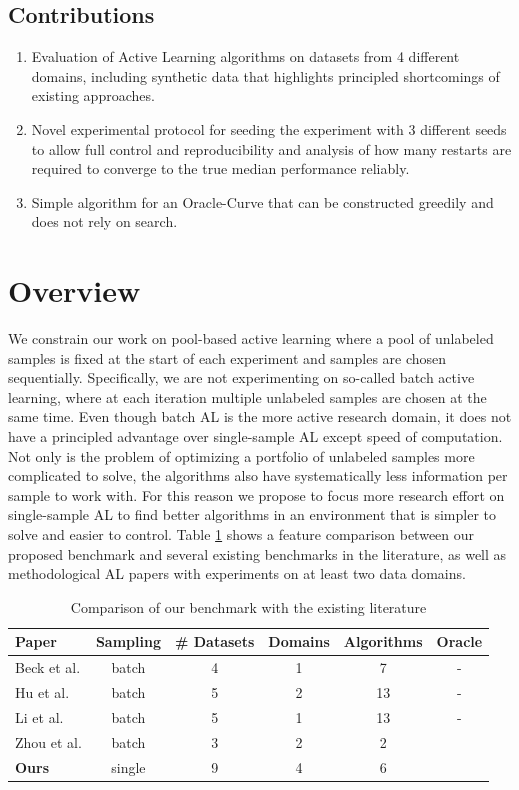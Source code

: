 \documentclass[]{article}
\begin{document}
\subsection{Contributions}
\begin{enumerate}
	\item Evaluation of Active Learning algorithms on datasets from 4 different domains, including synthetic data that highlights principled shortcomings of existing approaches.
	\item Novel experimental protocol for seeding the experiment with 3 different seeds to allow full control and reproducibility and analysis of how many restarts are required to converge to the true median performance reliably.
	\item Simple algorithm for an Oracle-Curve that can be constructed greedily and does not rely on search.
\end{enumerate}



\section{Overview}
We constrain our work on pool-based active learning where a pool of unlabeled samples is fixed at the start of each experiment and samples are chosen sequentially.
Specifically, we are not experimenting on so-called batch active learning, where at each iteration multiple unlabeled samples are chosen at the same time.
Even though batch AL is the more active research domain, it does not have a principled advantage over single-sample AL except speed of computation.
Not only is the problem of optimizing a portfolio of unlabeled samples more complicated to solve, the algorithms also have systematically less information per sample to work with.
For this reason we propose to focus more research effort on single-sample AL to find better algorithms in an environment that is simpler to solve and easier to control.
Table \ref{tab:benchmark_comparison} shows a feature comparison between our proposed benchmark and several existing benchmarks in the literature, as well as methodological AL papers with experiments on at least two data domains.
\begin{table}[h]
	\centering
	\begin{tabular}{l | c c c c c}
		Paper & Sampling & \# Datasets & Domains & Algorithms & Oracle \\
		\hline
		Beck et al. \cite{beck2021effective} & batch & 4 & 1 & 7 & - \\
		Hu et al. \cite{hu2021towards} & batch & 5 & 2 & 13 & - \\
		Li et al. \cite{li2022empirical} & batch & 5 & 1 & 13 & - \\
		Zhou et al. \cite{zhou2021towards} & batch & 3 & 2 & 2 & \checkmark \\
		\textbf{Ours} & single & 9 & 4 & 6 & \checkmark 
	\end{tabular}
	\caption{Comparison of our benchmark with the existing literature}
	\label{tab:benchmark_comparison}
\end{table}
\end{document}
